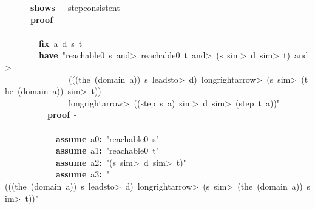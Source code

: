 \documentclass{article}
\newcommand{\syntaxKEYWORDA}[1]{\textcolor[rgb]{0.0,0.4,0.6}{\textbf{#1}}}
\newcommand{\syntaxKEYWORDB}[1]{\textcolor[rgb]{0.0,0.6,0.4}{\textbf{#1}}}
\newcommand{\syntaxKEYWORDC}[1]{\textcolor[rgb]{0.0,0.6,1.0}{\textbf{#1}}}
\newcommand{\syntaxLITERALA}[1]{\textcolor[rgb]{1.0,0.0,0.8}{#1}}
\newcommand{\syntaxOPERATOR}[1]{\textcolor[rgb]{0.0,0.0,0.0}{\textbf{#1}}}
\newcommand{\syntaxKEYWORDA}[1]{\textcolor[rgb]{0.0,0.4,0.6}{\textbf{#1}}}
\newcommand{\syntaxKEYWORDB}[1]{\textcolor[rgb]{0.0,0.6,0.4}{\textbf{#1}}}
\newcommand{\syntaxKEYWORDC}[1]{\textcolor[rgb]{0.0,0.6,1.0}{\textbf{#1}}}
\newcommand{\syntaxLITERALA}[1]{\textcolor[rgb]{1.0,0.0,0.8}{#1}}
\newcommand{\syntaxOPERATOR}[1]{\textcolor[rgb]{0.0,0.0,0.0}{\textbf{#1}}}
\newcommand{\syntaxKEYWORDA}[1]{\textcolor[rgb]{0.0,0.4,0.6}{\textbf{#1}}}
\newcommand{\syntaxKEYWORDB}[1]{\textcolor[rgb]{0.0,0.6,0.4}{\textbf{#1}}}
\newcommand{\syntaxKEYWORDC}[1]{\textcolor[rgb]{0.0,0.6,1.0}{\textbf{#1}}}
\newcommand{\syntaxLITERALA}[1]{\textcolor[rgb]{1.0,0.0,0.8}{#1}}
\newcommand{\syntaxOPERATOR}[1]{\textcolor[rgb]{0.0,0.0,0.0}{\textbf{#1}}}
\newcommand{\syntaxKEYWORDA}[1]{\textcolor[rgb]{0.0,0.4,0.6}{#1}}
\newcommand{\syntaxKEYWORDB}[1]{\textcolor[rgb]{0.0,0.6,0.4}{#1}}
\newcommand{\syntaxKEYWORDC}[1]{\textcolor[rgb]{0.0,0.6,1.0}{#1}}
\newcommand{\syntaxLITERALA}[1]{\textcolor[rgb]{1.0,0.0,0.8}{\textbf{#1}}}
\newcommand{\syntaxOPERATOR}[1]{\textcolor[rgb]{0.0,0.0,0.0}{#1}}
\newcommand{\syntaxKEYWORDA}[1]{\textcolor[rgb]{0.0,0.4,0.6}{\textbf{#1}}}
\newcommand{\syntaxKEYWORDB}[1]{\textcolor[rgb]{0.0,0.6,0.4}{\textbf{#1}}}
\newcommand{\syntaxKEYWORDC}[1]{\textcolor[rgb]{0.0,0.6,1.0}{\textbf{#1}}}
\newcommand{\syntaxLITERALA}[1]{\textcolor[rgb]{1.0,0.0,0.8}{#1}}
\newcommand{\syntaxOPERATOR}[1]{\textcolor[rgb]{0.0,0.0,0.0}{\textbf{#1}}}
\newcommand{\syntaxKEYWORDA}[1]{\textcolor[rgb]{0.0,0.4,0.6}{\textbf{#1}}}
\newcommand{\syntaxKEYWORDB}[1]{\textcolor[rgb]{0.0,0.6,0.4}{\textbf{#1}}}
\newcommand{\syntaxKEYWORDC}[1]{\textcolor[rgb]{0.0,0.6,1.0}{\textbf{#1}}}
\newcommand{\syntaxLITERALA}[1]{\textcolor[rgb]{1.0,0.0,0.8}{#1}}
\newcommand{\syntaxOPERATOR}[1]{\textcolor[rgb]{0.0,0.0,0.0}{\textbf{#1}}}
\begin{document}
{\ }{\ }{\ }{\ }{\ }{\ }\syntaxKEYWORDB{shows}{\ }{\ }{\ }step\usebox{\underscorebox}consistent\hspace*{\fill}\\
{\ }{\ }{\ }{\ }{\ }{\ }\syntaxKEYWORDA{proof}{\ }{-}\hspace*{\fill}\\
{\ }{\ }{\ }{\ }{\ }{\ }\syntaxKEYWORDA{\usebox{\opencurlybracket}}\hspace*{\fill}\\
{\ }{\ }{\ }{\ }{\ }{\ }{\ }{\ }\syntaxKEYWORDC{fix}{\ }a{\ }d{\ }s{\ }t\hspace*{\fill}\\
{\ }{\ }{\ }{\ }{\ }{\ }{\ }{\ }\syntaxKEYWORDA{have}{\ }\syntaxLITERALA{"reachable0{\ }s{\ }\<and>{\ }reachable0{\ }t{\ }\<and>{\ }(s{\ }\<sim>{\ }d{\ }\<sim>{\ }t){\ }\<and>{\ }}\hspace*{\fill}\\
\syntaxLITERALA{{\ }{\ }{\ }{\ }{\ }{\ }{\ }{\ }{\ }{\ }{\ }{\ }{\ }{\ }{\ }(((the{\ }(domain{\ }a)){\ }\usebox{\atbox}{\ }s{\ }\<leadsto>{\ }d){\ }\<longrightarrow>{\ }(s{\ }\<sim>{\ }(the{\ }(domain{\ }a)){\ }\<sim>{\ }t))}\hspace*{\fill}\\
\syntaxLITERALA{{\ }{\ }{\ }{\ }{\ }{\ }{\ }{\ }{\ }{\ }{\ }{\ }{\ }{\ }{\ }\<longrightarrow>{\ }((step{\ }s{\ }a){\ }\<sim>{\ }d{\ }\<sim>{\ }(step{\ }t{\ }a))"}\hspace*{\fill}\\
{\ }{\ }{\ }{\ }{\ }{\ }{\ }{\ }{\ }{\ }\syntaxKEYWORDA{proof}{\ }{-}\hspace*{\fill}\\
{\ }{\ }{\ }{\ }{\ }{\ }{\ }{\ }{\ }{\ }\syntaxKEYWORDA{\usebox{\opencurlybracket}}\hspace*{\fill}\\
{\ }{\ }{\ }{\ }{\ }{\ }{\ }{\ }{\ }{\ }{\ }{\ }\syntaxKEYWORDC{assume}{\ }a0\syntaxOPERATOR{:}{\ }\syntaxLITERALA{"reachable0{\ }s"}\hspace*{\fill}\\
{\ }{\ }{\ }{\ }{\ }{\ }{\ }{\ }{\ }{\ }{\ }{\ }\syntaxKEYWORDC{assume}{\ }a1\syntaxOPERATOR{:}{\ }\syntaxLITERALA{"reachable0{\ }t"}\hspace*{\fill}\\
{\ }{\ }{\ }{\ }{\ }{\ }{\ }{\ }{\ }{\ }{\ }{\ }\syntaxKEYWORDC{assume}{\ }a2\syntaxOPERATOR{:}{\ }\syntaxLITERALA{"(s{\ }\<sim>{\ }d{\ }\<sim>{\ }t)"}\hspace*{\fill}\\
{\ }{\ }{\ }{\ }{\ }{\ }{\ }{\ }{\ }{\ }{\ }{\ }\syntaxKEYWORDC{assume}{\ }a3\syntaxOPERATOR{:}{\ }\syntaxLITERALA{"(((the{\ }(domain{\ }a)){\ }\usebox{\atbox}{\ }s{\ }\<leadsto>{\ }d){\ }\<longrightarrow>{\ }(s{\ }\<sim>{\ }(the{\ }(domain{\ }a)){\ }\<sim>{\ }t))"}\hspace*{\fill}\\
\end{document}
